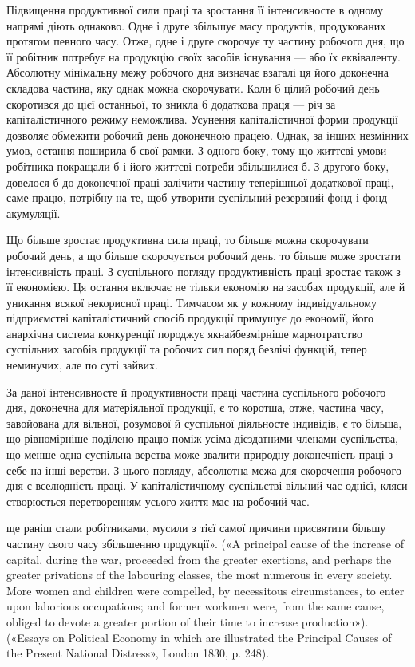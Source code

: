 Підвищення продуктивної сили праці та зростання її інтенсивносте
в одному напрямі діють однаково. Одне і друге збільшує
масу продуктів, продукованих протягом певного часу. Отже,
одне і друге скорочує ту частину робочого дня, що її робітник
потребує на продукцію своїх засобів існування — або їх еквіваленту.
Абсолютну мінімальну межу робочого дня визначає
взагалі ця його доконечна складова частина, яку однак можна
скорочувати. Коли б цілий робочий день скоротився до цієї останньої,
то зникла б додаткова праця — річ за капіталістичного
режиму неможлива. Усунення капіталістичної форми продукції
дозволяє обмежити робочий день доконечною працею. Однак, за
інших незмінних умов, остання поширила б свої рамки. З одного
боку, тому що життєві умови робітника покращали б і його життєві
потреби збільшилися б. З другого боку, довелося б до доконечної
праці залічити частину теперішньої додаткової праці,
саме працю, потрібну на те, щоб утворити суспільний резервний
фонд і фонд акумуляції.

Що більше зростає продуктивна сила праці, то більше можна
скорочувати робочий день, а що більше скорочується робочий
день, то більше може зростати інтенсивність праці. З суспільного
погляду продуктивність праці зростає також з її економією. Ця
остання включає не тільки економію на засобах продукції, але й
уникання всякої некорисної праці. Тимчасом як у кожному індивідуальному
підприємстві капіталістичний спосіб продукції примушує
до економії, його анархічна система конкуренції породжує
якнайбезмірніше марнотратство суспільних засобів продукції
та робочих сил поряд безлічі функцій, тепер неминучих, але по
суті зайвих.

За даної інтенсивносте й продуктивности праці частина суспільного
робочого дня, доконечна для матеріяльної продукції,
є то коротша, отже, частина часу, завойована для вільної, розумової
й суспільної діяльносте індивідів, є то більша, що рівномірніше
поділено працю поміж усіма дієздатними членами суспільства,
що менше одна суспільна верства може звалити природну
доконечність праці з себе на інші верстви. З цього погляду,
абсолютна межа для скорочення робочого дня є вселюдність праці.
У капіталістичному суспільстві вільний час однієї, кляси створюється
перетворенням усього життя мас на робочий час.

ще раніш стали робітниками, мусили з тієї самої причини присвятити
більшу частину свого часу збільшенню продукції». («A principal cause
of the increase of capital, during the war, proceeded from the greater exertions,
and perhaps the greater privations of the labouring classes, the most
numerous in every society. More women and children were compelled, by
necessitous circumstances, to enter upon laborious occupations; and former
workmen were, from the same cause, obliged to devote a greater portion
of their time to increase production»). («Essays on Political Economy in
which are illustrated the Principal Causes of the Present National Distress»,
London 1830, p. 248).
